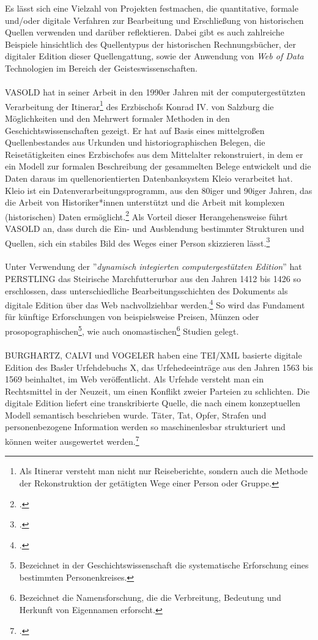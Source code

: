 \documentclass[12pt,a4paper]{article}
\begin{document}
Es lässt sich eine Vielzahl von Projekten festmachen, die quantitative, formale und/oder digitale Verfahren zur Bearbeitung und Erschließung von historischen Quellen verwenden und darüber reflektieren. Dabei gibt es auch zahlreiche Beispiele hinsichtlich des Quellentypus der historischen Rechnungsbücher, der digitaler Edition dieser Quellengattung, sowie der Anwendung von \textit{Web of Data} Technologien im Bereich der Geisteswissenschaften.
\\
\\
VASOLD hat in seiner Arbeit in den 1990er Jahren mit der computergestützten Verarbeitung der Itinerar\footnote{Als Itinerar versteht man nicht nur Reiseberichte, sondern auch die Methode der Rekonstruktion der getätigten Wege einer Person oder Gruppe.} des Erzbischofs Konrad IV. von Salzburg die Möglichkeiten und den Mehrwert formaler Methoden in den Geschichtswissenschaften gezeigt. Er hat auf Basis eines mittelgroßen Quellenbestandes aus Urkunden und historiographischen Belegen, die Reisetätigkeiten eines Erzbischofes aus dem Mittelalter rekonstruiert, in dem er ein Modell zur formalen Beschreibung der gesammelten Belege entwickelt und die Daten daraus im quellenorientierten Datenbanksystem Kleio verarbeitet hat. Kleio ist ein Datenverarbeitungsprogramm, aus den 80iger und 90iger Jahren, das die Arbeit von Historiker*innen unterstützt und die Arbeit mit komplexen (historischen) Daten ermöglicht.\footcite[][S.172-174]{hoffmann1990ehepaare}  Als Vorteil dieser Herangehensweise führt VASOLD an, dass durch die Ein- und Ausblendung bestimmter Strukturen und Quellen, sich ein stabiles Bild des Weges einer Person skizzieren lässt.\footcite{vasold1996itinerar}
\\
\\
Unter Verwendung der ''\textit{dynamisch integierten computergestützten Edition}'' hat PERSTLING das Steirische Marchfutterurbar aus den Jahren 1412 bis 1426 so erschlossen, dass unterschiedliche Bearbeitungsschichten des Dokuments als digitale Edition über das Web nachvollziehbar werden.\footcite{PerstlingMatthias2013MDuE} So wird das Fundament für künftige  Erforschungen von beispielsweise Preisen, Münzen oder prosopographischen\footnote{Bezeichnet in der Geschichtswissenschaft die systematische Erforschung eines bestimmten Personenkreises.}, wie  auch onomastischen\footnote{Bezeichnet die Namensforschung, die die Verbreitung, Bedeutung und Herkunft von Eigennamen erforscht.} Studien gelegt.
\\
\\
BURGHARTZ, CALVI und VOGELER haben eine TEI/XML basierte digitale Edition des Basler Urfehdebuchs X, das Urfehedeeinträge aus den Jahren 1563 bis 1569 beinhaltet, im Web veröffentlicht. Als Urfehde versteht man ein Rechtsmittel in der Neuzeit, um einen Konflikt zweier Parteien zu schlichten. Die digitale Edition liefert eine transkribierte Quelle, die nach einem konzeptuellen Modell semantisch beschrieben wurde. Täter, Tat, Opfer, Strafen und personenbezogene Information werden so maschinenlesbar strukturiert und können weiter ausgewertet werden.\footcite[][S.27-29]{pollin2017semantically} 
\end{document}
